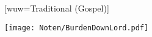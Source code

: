 [wuw={Traditional (Gospel)}]


\beginverse
\endverse
\centering\texttt{[image: Noten/BurdenDownLord.pdf]}





\endsong
\beginscripture{}
\endscripture

\begin{intersong}

\end{intersong}